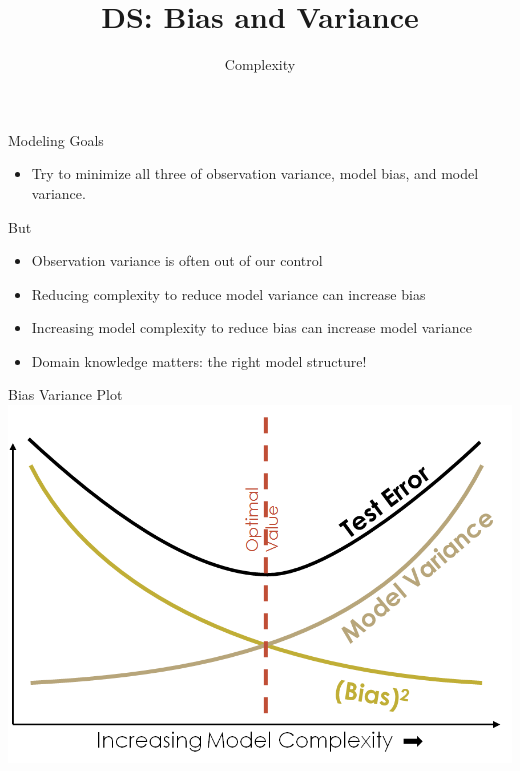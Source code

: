 \documentclass[aspectratio=169]{../latex_main/tntbeamer}  %
\title[Introduction]{DS: Bias and Variance}
\subtitle{Complexity}
\begin{document}
	
	\maketitle
	\begin{frame}[c]{Modeling Goals}
	    \begin{itemize}
	        \item Try to minimize all three of observation variance, model bias, and model variance.
	    \end{itemize}
	    But
	    \begin{itemize}
	        \item Observation variance is often out of our control
	        \item Reducing complexity to reduce model variance can increase bias
	        \item Increasing model complexity to reduce bias can increase model variance
	        \item Domain knowledge matters: the right model structure!
	    \end{itemize}
	\end{frame}
	
	
	\begin{frame}{Bias Variance Plot}
	    \centering
	    \includegraphics[scale=.4]{Bild14}
	\end{frame}
	
\end{document}
